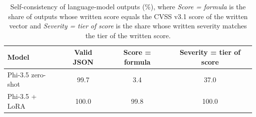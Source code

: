 \begin{table}[htbp]
\centering
\caption{Self-consistency of language-model outputs (\%), where \emph{Score = formula} is the share of outputs whose written score equals the CVSS v3.1 score of the written vector and \emph{Severity = tier of score} is the share whose written severity matches the tier of the written score.}
\label{tab:consistency}
\small
\begin{tabular}{lccc}
\toprule
Model & Valid JSON & Score = formula & Severity = tier of score \\
\midrule
Phi-3.5 zero-shot & 99.7 & 3.4 & 37.0 \\
Phi-3.5 + LoRA & 100.0 & 99.8 & 100.0 \\
\bottomrule
\end{tabular}
\end{table}
